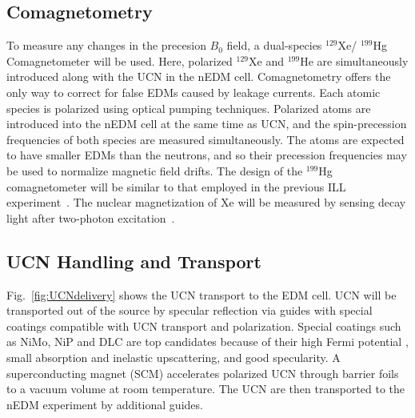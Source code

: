 \subsection{Comagnetometry}
To measure any changes in the precesion $B_0$ field, a dual-species
$^{129}$Xe/ $^{199}$Hg Comagnetometer will be used. Here, polarized
$^{129}$Xe and $^{199}$He are simultaneously introduced along with the
UCN in the nEDM cell. Comagnetometry offers the only way to correct
for false EDMs caused by leakage currents.  Each atomic species is
polarized using optical pumping techniques. Polarized atoms are
introduced into the nEDM cell at the same time as UCN, and the
spin-precession frequencies of both species are measured
simultaneously. The atoms are expected to have smaller EDMs than the
neutrons, and so their precession frequencies may be used to normalize
magnetic field drifts.  The design of the $^{199}$Hg comagnetometer
will be similar to that employed in the previous ILL
experiment~\cite{Baker2006,Griffith2009}. The nuclear magnetization of
Xe will be measured by sensing decay light after two-photon
excitation~\cite{momose2014development}.


\subsection{UCN Handling and Transport}
Fig.~\ref{fig:UCNdelivery} shows the UCN transport to the EDM cell.
UCN will be transported out of the source by specular reflection via
guides with special coatings compatible with UCN transport and
polarization. Special coatings such as NiMo, NiP and DLC are top
candidates because of their high Fermi potential , small absorption
and inelastic upscattering, and good specularity.  A superconducting
magnet (SCM) accelerates polarized UCN through barrier foils to a
vacuum volume at room temperature. The UCN are then transported to the
nEDM experiment by additional guides.



